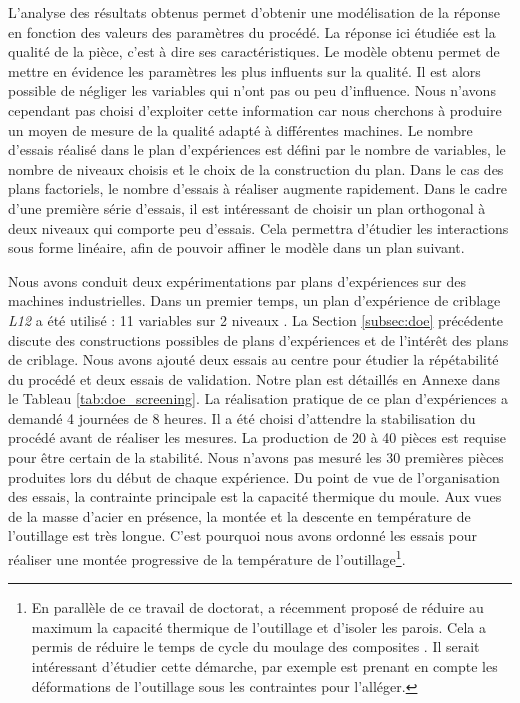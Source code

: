 L'analyse des résultats obtenus permet d'obtenir une modélisation de la réponse en fonction des valeurs des paramètres du procédé.
La réponse ici étudiée est la qualité de la pièce, c'est à dire ses caractéristiques.
Le modèle obtenu permet de mettre en évidence les paramètres les plus influents sur la qualité.
Il est alors possible de négliger les variables qui n'ont pas ou peu d'influence.
Nous n'avons cependant pas choisi d'exploiter cette information car nous cherchons à produire un moyen de mesure de la qualité adapté à différentes machines.
Le nombre d'essais réalisé dans le plan d'expériences est défini par le nombre de variables, le nombre de niveaux choisis et le choix de la construction du plan.
Dans le cas des plans factoriels, le nombre d'essais à réaliser augmente rapidement.
Dans le cadre d'une première série d'essais, il est intéressant de choisir un plan orthogonal à deux niveaux qui comporte peu d'essais.
Cela permettra d'étudier les interactions sous forme linéaire, afin de pouvoir affiner le modèle dans un plan suivant.

Nous avons conduit deux expérimentations par plans d'expériences sur des machines industrielles.
Dans un premier temps, un plan d'expérience de criblage \textit{L12} a été utilisé : 11 variables sur 2 niveaux \cite{plackett_design_1946}.
La Section \ref{subsec:doe} précédente discute des constructions possibles de plans d'expériences et de l'intérêt des plans de criblage.
Nous avons ajouté deux essais au centre pour étudier la répétabilité du procédé et deux essais de validation.
Notre plan est détaillés en Annexe dans le Tableau \ref{tab:doe_screening}.
La réalisation pratique de ce plan d'expériences a demandé 4 journées de 8 heures.
Il a été choisi d'attendre la stabilisation du procédé avant de réaliser les mesures.
La production de 20 à 40 pièces est requise pour être certain de la stabilité.
Nous n'avons pas mesuré les 30 premières pièces produites lors du début de chaque expérience.
Du point de vue de l'organisation des essais, la contrainte principale est la capacité thermique du moule.
Aux vues de la masse d'acier en présence, la montée et la descente en température de l'outillage est très longue.
C'est pourquoi nous avons ordonné les essais pour réaliser une montée progressive de la température de l'outillage\footnote{En parallèle de ce travail de doctorat, \citeauthor{collomb_2018} a récemment proposé de réduire au maximum la capacité thermique de l'outillage et d'isoler les parois. Cela a permis de réduire le temps de cycle du moulage des composites \cite{collomb_2018}.
	Il serait intéressant d'étudier cette démarche, par exemple est prenant en compte les déformations de l'outillage sous les contraintes pour l'alléger.}.

